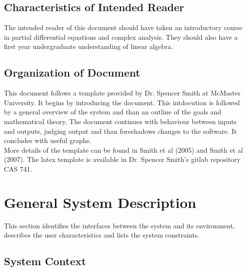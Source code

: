 \documentclass[12pt]{article}
\begin{document}
\subsection{Characteristics of Intended Reader} 

The intended reader of this document should have taken an introductory course 
in partial differential equations and complex analysis. They should also have a 
first year undergraduate understanding of linear algebra.\\

\subsection{Organization of Document}

This document follows a template provided by Dr. Spencer Smith at McMaster 
University. It begins by introducing the document. This intdocution is followed 
by a general overview of the system and than an outline of the goals and 
mathematical theory. The document continues with behaviour between inputs and 
outputs, judging output and than foreshadows changes to the software. It 
concludes with useful graphs. \\ 
More details of the template can be found in Smith et al (2005) and Smith et al 
(2007). The latex template is available in Dr. Spencer Smith's gitlab 
repository CAS 741. \\

\section{General System Description}

This section identifies the interfaces between the system and its environment,
describes the user characteristics and lists the system constraints.

\subsection{System Context}
\end{document}

